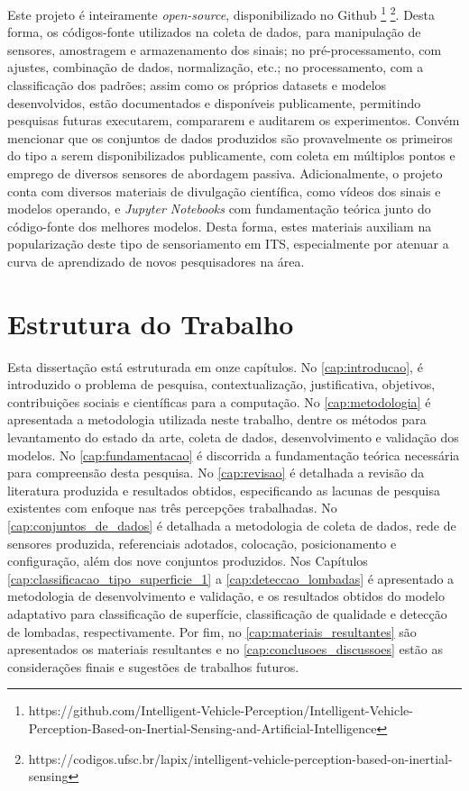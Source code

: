 Este projeto é inteiramente \textit{open-source}, disponibilizado no Github \footnote{https://github.com/Intelligent-Vehicle-Perception/Intelligent-Vehicle-Perception-Based-on-Inertial-Sensing-and-Artificial-Intelligence} \footnote{https://codigos.ufsc.br/lapix/intelligent-vehicle-perception-based-on-inertial-sensing}. Desta forma, os códigos-fonte utilizados na coleta de dados, para manipulação de sensores, amostragem e armazenamento dos sinais; no pré-processamento, com ajustes, combinação de dados, normalização, etc.; no processamento, com a classificação dos padrões; assim como os próprios datasets e modelos desenvolvidos, estão documentados e disponíveis publicamente, permitindo pesquisas futuras executarem, compararem e auditarem os experimentos. Convém mencionar que os conjuntos de dados produzidos são provavelmente os primeiros do tipo a serem disponibilizados publicamente, com coleta em múltiplos pontos e emprego de diversos sensores de abordagem passiva. Adicionalmente, o projeto conta com diversos materiais de divulgação científica, como vídeos dos sinais e modelos operando, e \textit{Jupyter Notebooks} com fundamentação teórica junto do código-fonte dos melhores modelos. Desta forma, estes materiais auxiliam na popularização deste tipo de sensoriamento em ITS, especialmente por atenuar a curva de aprendizado de novos pesquisadores na área.
 
\section{Estrutura do Trabalho}

Esta dissertação está estruturada em onze capítulos. No \autoref{cap:introducao}, é introduzido o problema de pesquisa, contextualização, justificativa, objetivos, contribuições sociais e científicas para a computação. No \autoref{cap:metodologia} é apresentada a metodologia utilizada neste trabalho, dentre os métodos para levantamento do estado da arte, coleta de dados, desenvolvimento e validação dos modelos. No \autoref{cap:fundamentacao} é discorrida a fundamentação teórica necessária para compreensão desta pesquisa. No \autoref{cap:revisao} é detalhada a revisão da literatura produzida e resultados obtidos, especificando as lacunas de pesquisa existentes com enfoque nas três percepções trabalhadas. No \autoref{cap:conjuntos_de_dados} é detalhada a metodologia de coleta de dados, rede de sensores produzida, referenciais adotados, colocação, posicionamento e configuração, além dos nove conjuntos produzidos. Nos Capítulos \ref{cap:classificacao_tipo_superficie_1} a \ref{cap:deteccao_lombadas} é apresentado a metodologia de desenvolvimento e validação, e os resultados obtidos do modelo adaptativo para classificação de superfície, classificação de qualidade e detecção de lombadas, respectivamente. Por fim, no \autoref{cap:materiais_resultantes} são apresentados os materiais resultantes e no \autoref{cap:conclusoes_discussoes} estão as considerações finais e sugestões de trabalhos futuros.
